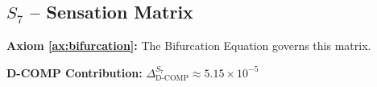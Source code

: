 
\subsection{$S_{7}$ -- Sensation Matrix}\label{sec:19.1}

\textbf{Axiom \ref{ax:bifurcation}:} The Bifurcation Equation governs this matrix.

\textbf{D-COMP Contribution:} $\Delta_{\text{D-COMP}}^{S_7} \approx 5.15 \times 10^{-5}$

